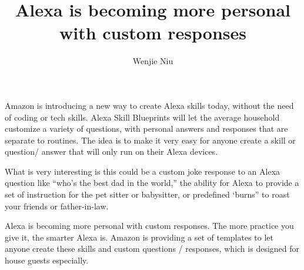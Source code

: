 \documentclass{article}
\author{Wenjie Niu}
\title{Alexa is becoming more personal with custom responses}
\begin{document}
\maketitle
Amazon is introducing a new way to create Alexa skills today, without the need of coding or tech skills. Alexa Skill Blueprints will let the average household customize a variety of questions, with personal answers and responses that are separate to routines. The idea is to make it very easy for anyone create a skill or question/ answer that will only run on their Alexa devices. 

	What is very interesting is this could be a custom joke response to an Alexa question like “who’s the best dad in the world,” the ability for Alexa to provide a set of instruction for the pet sitter or babysitter, or predefined ‘burns” to roast your friends or father-in-law. 

	Alexa is becoming more personal with custom responses. The more practice you give it, the smarter Alexa is. Amazon is providing a set of templates to let anyone create these skills and custom questions / responses, which is designed for house guests especially.
\end{document}
